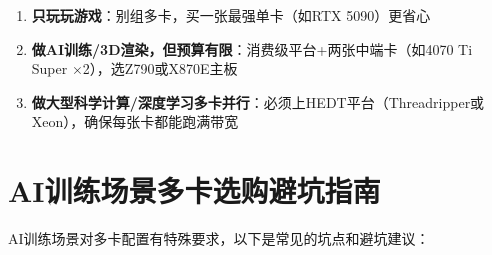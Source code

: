 \documentclass[12pt,UTF8]{ctexbook}
\begin{document}
\begin{enumerate}
    \item \textbf{只玩玩游戏}：别组多卡，买一张最强单卡（如RTX 5090）更省心
    \item \textbf{做AI训练/3D渲染，但预算有限}：消费级平台+两张中端卡（如4070 Ti Super $\times$2），选Z790或X870E主板
    \item \textbf{做大型科学计算/深度学习多卡并行}：必须上HEDT平台（Threadripper或Xeon），确保每张卡都能跑满带宽
\end{enumerate}

\section{AI训练场景多卡选购避坑指南}

AI训练场景对多卡配置有特殊要求，以下是常见的坑点和避坑建议：
\end{document}
